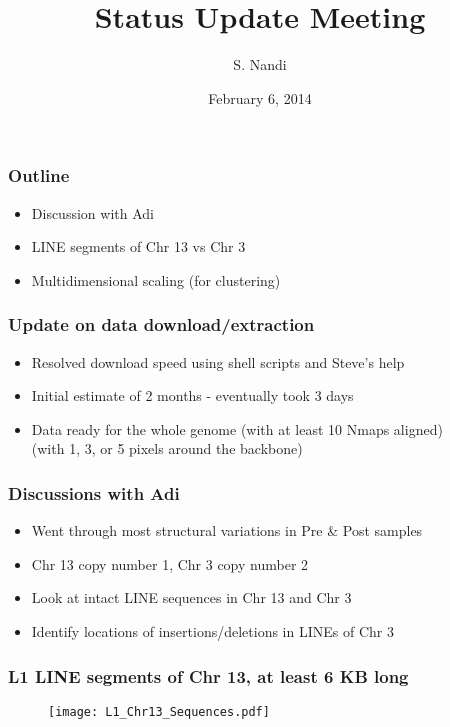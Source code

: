 \documentclass[10pt,dvipsnames,table]{beamer}
\title[Status Update Feb, 2015]{Status Update Meeting}
\author{S. Nandi}
\institute[LMCG]{LMCG \\
 University of Wisconsin-Madison}
\date{February 6, 2014}
\begin{document}
\setlength{\baselineskip}{16truept}
\frame{\maketitle}

\begin{frame}
\frametitle{Outline}
\begin{itemize}
\item Discussion with Adi
\item LINE segments of Chr 13 vs Chr 3
\item Multidimensional scaling (for clustering)
\end{itemize}
\end{frame}

\begin{frame}
\frametitle{Update on data download/extraction}
\begin{itemize}
\item Resolved download speed using shell scripts and Steve's help
\item Initial estimate of 2 months - eventually took 3 days
\item Data ready for the whole genome (with at least 10 Nmaps aligned) \\
  (with 1, 3, or 5 pixels around the backbone)
\end{itemize}
\end{frame}

\begin{frame}
\frametitle{Discussions with Adi}
\begin{itemize}
\pause \item Went through most structural variations in Pre \& Post samples
\pause \item Chr 13 copy number 1, Chr 3 copy number 2
\pause \item Look at intact LINE sequences in Chr 13 and Chr 3
\pause \item Identify locations of insertions/deletions in LINEs of Chr 3
\end{itemize}
\end{frame}

\begin{frame}
\frametitle{L1 LINE segments of Chr 13, at least 6 KB long}
\begin{figure}
\centering
\texttt{[image: L1\_Chr13\_Sequences.pdf]}
\end{figure}
\end{frame}
\end{document}
